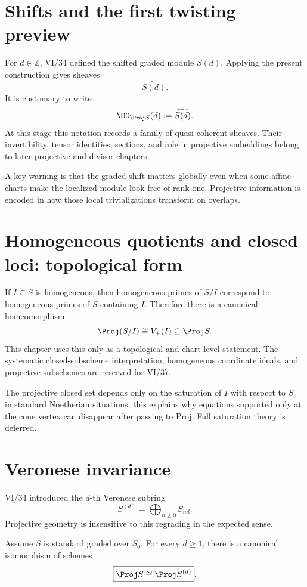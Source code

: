 

\section{Shifts and the first twisting preview}
For \(d\in\mathbb Z\), VI/34 defined the shifted graded module \(S(d)\).  Applying the present construction gives sheaves
\[
\widetilde{S(d)}.
\]
It is customary to write
\[
\OO_{\Proj S}(d):=\widetilde{S(d)}.
\]
At this stage this notation records a family of quasi-coherent sheaves.  Their invertibility, tensor identities, sections, and role in projective embeddings belong to later projective and divisor chapters.

A key warning is that the graded shift matters globally even when some affine charts make the localized module look free of rank one.  Projective information is encoded in how those local trivializations transform on overlaps.

\section{Homogeneous quotients and closed loci: topological form}
If \(I\subseteq S\) is homogeneous, then homogeneous primes of \(S/I\) correspond to homogeneous primes of \(S\) containing \(I\).  Therefore there is a canonical homeomorphism
\[
\Proj(S/I)\cong V_+(I)\subseteq\Proj S.
\]
This chapter uses this only as a topological and chart-level statement.  The systematic closed-subscheme interpretation, homogeneous coordinate ideals, and projective subschemes are reserved for VI/37.

The projective closed set depends only on the saturation of \(I\) with respect to \(S_+\) in standard Noetherian situations; this explains why equations supported only at the cone vertex can disappear after passing to Proj.  Full saturation theory is deferred.

\section{Veronese invariance}
VI/34 introduced the \(d\)-th Veronese subring
\[
S^{(d)}=\bigoplus_{n\ge0}S_{nd}.
\]
Projective geometry is insensitive to this regrading in the expected sense.

\begin{theorem}\label{thm:vi35-veronese}
Assume \(S\) is standard graded over \(S_0\). For every \(d\ge1\), there is a canonical isomorphism of schemes
\[
\boxed{\Proj S\cong\Proj S^{(d)}}.
\]
\end{theorem}

